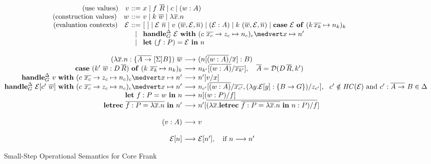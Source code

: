 \documentclass{sigplanconf}
\makeatletter
\newcommand{\EC}{\mathcal{E}}
\newcommand{\many}{\overline}
\newcommand{\reducesto}{\longrightarrow}
\newcommand\ba{\begin{array}}
\newcommand\ea{\end{array}}
\newenvironment{equations}{\[\ba{@{}r@{~}c@{~}l@{}}}{\ea\]\ignorespacesafterend}
\newcommand{\sigs}{\Sigma}
\newcommand{\effbox}[1]{[#1]}
\newcommand{\key}[1]{\mathbf{#1}} %
\newcommand{\var}{\mathit}        %
\newcommand{\handleSymbol}{\rightarrow}
\newcommand{\handle}[2]{{#1} \handleSymbol {#2}}
\newcommand{\thunk}[1]{\{{#1}\}}
\newcommand{\adj}{\Delta}
\makeatother
\begin{document}
\begin{figure*}

\begin{equations}
(\textrm{use values}) \quad v &::=& x \mid f~\many{R} \mid c \mid (w : A) \\
(\textrm{construction values}) \quad w &::=& v \mid k~\many{w} \mid \lambda \many{x}.n \\
(\textrm{evaluation contexts})\quad \EC
  &::= & [~] \mid \EC~\many{n} \mid v~(\many{w},\EC,\many{n})
             \mid (\EC : A)
             \mid k~(\many{w},\EC,\many{n})
             \mid \key{case}~\EC~\key{of}~(k\,\many{x_k} \mapsto n_k)_k \\
  &\mid& \key{handle}^\adj_G~ \EC ~\key{with}~
            (\handle{c~\many{x_c}}{z_c} \mapsto n_c)_c \medvert
            x \mapsto n' \\
  &\mid& \key{let}~(f : P) = \EC~\key{in}~n \\
\end{equations}%

\begin{equations}
(\lambda \many{x}.n : \thunk{\many{A \to}~\effbox{\sigs}B})~\many{w} &\reducesto& (n[\many{(w : A)} / \many{x}] : B) \\
\key{case}~(k'~\many{w} : D\,\many{R})~\key{of}~(k~\many{x_k} \mapsto n_k)_k
  &\reducesto& n_{k'}[\many{(w : A)} / \many{x_{k'}}],
     \quad \many{A} = \dcon(D\,\many{R}, k') \\
\key{handle}^\adj_G~v~\key{with}~(\handle{c~\many{x_c}}{z_c} \mapsto n_c)_c \medvert x \mapsto n'
  &\reducesto& n'[v / x] \\
\key{handle}^\adj_G~\EC[c'~\many{w}]~\key{with}~(\handle{c~\many{x_c}}{z_c} \mapsto n_c)_c \medvert x \mapsto n'
  &\reducesto& n_{c'}[\many{(w : A)} / \many{x_{c'}}, (\lambda y.\EC[y] : \thunk{B \to G}) / z_{c'}],
  ~~ c' \notin \var{HC}(\EC) \text{ and } c':\many{A \to}~B \in \adj \\
\key{let}~f : P = w~\key{in}~n
  &\reducesto&
    n[(w : P) / f] \\
\key{letrec}~\many{f : P = \lambda \many{x}.n}~\key{in}~n'
  &\reducesto&
    n'[\many{(\lambda \many{x}.\key{letrec}~\many{f : P = \lambda \many{x}.n}~\key{in}~n : P) / f}] \\
\\
(v : A) &\reducesto& v \\
\\
\EC[n] &\reducesto& \EC[n'], \quad \text{if }n \reducesto n' \\
\end{equations}%

\caption{Small-Step Operational Semantics for Core Frank}
\label{fig:semantics}
\end{figure*}
\end{document}
